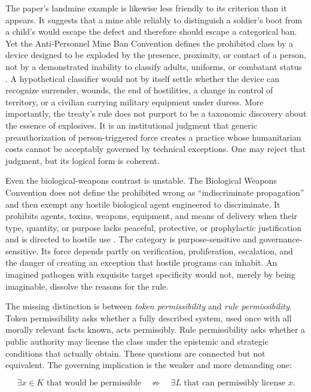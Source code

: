 \documentclass[11pt]{article}
\begin{document}
The paper's landmine example is likewise less friendly to its criterion than it appears. It suggests that a mine able reliably to distinguish a soldier's boot from a child's would escape the defect and therefore should escape a categorical ban. Yet the Anti-Personnel Mine Ban Convention defines the prohibited class by a device designed to be exploded by the presence, proximity, or contact of a person, not by a demonstrated inability to classify adults, uniforms, or combatant status \citep{mineban1997}. A hypothetical classifier would not by itself settle whether the device can recognize surrender, wounds, the end of hostilities, a change in control of territory, or a civilian carrying military equipment under duress. More importantly, the treaty's rule does not purport to be a taxonomic discovery about the essence of explosives. It is an institutional judgment that generic preauthorization of person-triggered force creates a practice whose humanitarian costs cannot be acceptably governed by technical exceptions. One may reject that judgment, but its logical form is coherent.

Even the biological-weapons contrast is unstable. The Biological Weapons Convention does not define the prohibited wrong as ``indiscriminate propagation'' and then exempt any hostile biological agent engineered to discriminate. It prohibits agents, toxins, weapons, equipment, and means of delivery when their type, quantity, or purpose lacks peaceful, protective, or prophylactic justification and is directed to hostile use \citep{bwc1972}. The category is purpose-sensitive and governance-sensitive. Its force depends partly on verification, proliferation, escalation, and the danger of creating an exception that hostile programs can inhabit. An imagined pathogen with exquisite target specificity would not, merely by being imaginable, dissolve the reasons for the rule.

The missing distinction is between \emph{token permissibility} and \emph{rule permissibility}. Token permissibility asks whether a fully described system, used once with all morally relevant facts known, acts permissibly. Rule permissibility asks whether a public authority may license the class under the epistemic and strategic conditions that actually obtain. These questions are connected but not equivalent. The governing implication is the weaker and more demanding one:

\[
\exists x\in K\text{ that would be permissible} \quad \not\Rightarrow \quad
\exists L\text{ that can permissibly license }x.
\]
\end{document}
